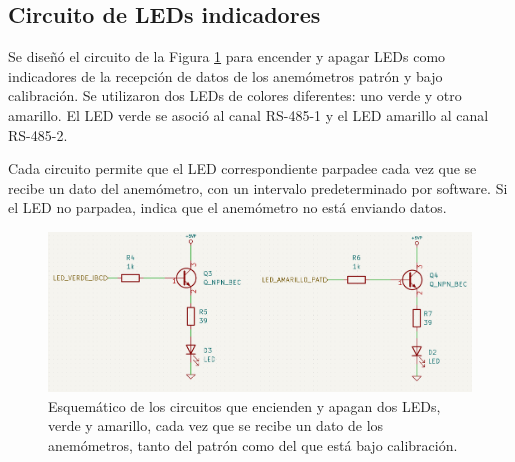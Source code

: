 \subsection{Circuito de LEDs indicadores}
Se diseñó el circuito de la Figura \ref{fig:esquemLedsSensor}  para encender y apagar LEDs como indicadores de la recepción de datos de los anemómetros patrón y bajo calibración. Se utilizaron dos LEDs de colores diferentes: uno verde y otro amarillo. El LED verde se asoció al canal RS-485-1 y el LED amarillo al canal RS-485-2.

Cada circuito permite que el LED correspondiente parpadee cada vez que se recibe un dato del anemómetro, con un intervalo predeterminado por software. Si el LED no parpadea, indica que el anemómetro no está enviando datos.%


\begin{figure}[H]
    \centering
    \includegraphics[width=0.95\linewidth]{Figuras/datalogger/Hardware/esquemLedsSensor.png}
    \caption{Esquemático de los circuitos que encienden y apagan dos LEDs, verde y amarillo, cada vez que se recibe un dato de los anemómetros, tanto del patrón como del que está bajo calibración.}

    \label{fig:esquemLedsSensor}
\end{figure}

